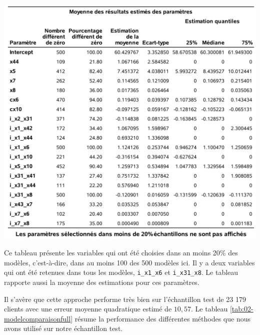 \documentclass[
  11pt,
  letterpaper,
]{book}
\theoremstyle{definition}
\theoremstyle{definition}
\theoremstyle{definition}
\theoremstyle{remark}
\begin{document}
\begin{center}\includegraphics[width=0.9\linewidth]{figures/02-select-e16} \end{center}

Ce tableau présente les variables qui ont été choisies dans an moins 20\% des modèles, c'est-à-dire, dans au moins 100 des 500 modèles ici. Il y a deux variables qui ont été retenues dans tous les modèles, \texttt{i\_x1\_x6} et \texttt{i\_x31\_x8}. Le tableau rapporte aussi la moyenne des estimations pour ces paramètres.

Il s'avère que cette approche performe très bien sur l'échantillon test de 23 179 clients avec une erreur moyenne quadratique estimé de \(10,57\). Le tableau \ref{tab:02-modelcomparaisonfull} résume la performance des différentes méthodes que nous avons utilisé sur notre échantillon test.
\end{document}
